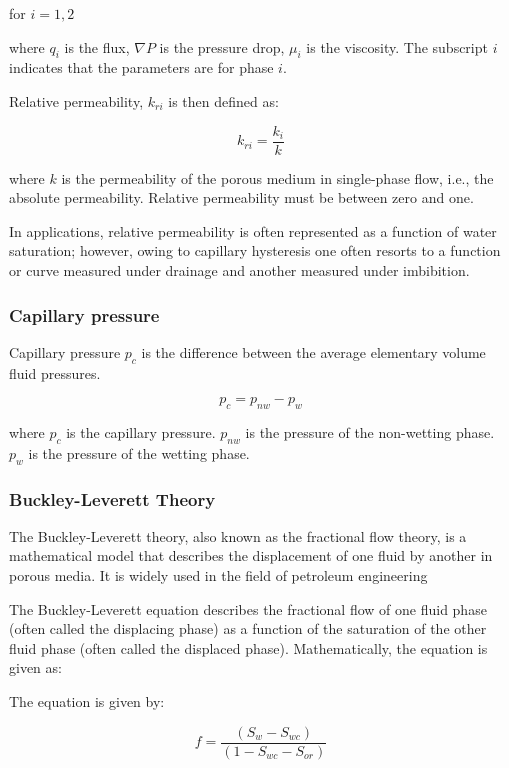 		for $i = 1 , 2$
		
		where $q_{i}$ is the flux, $\nabla P$ is the pressure drop, $\mu _{i}$ is the viscosity. The subscript $i$ indicates that the parameters are for phase $i$.

		Relative permeability, $k_{ri}$ is then defined as:

		\[ k_{ri} = \frac{k_{i}}{k} \]

		where $k$ is the permeability of the porous medium in single-phase flow, i.e., the absolute permeability. Relative permeability must be between zero and one.

		In applications, relative permeability is often represented as a function of water saturation; however, owing to capillary hysteresis one often resorts to a function or curve measured under drainage and another measured under imbibition. \cite{bravo2008analysis}
	
	
	\subsubsection{Capillary pressure}
		Capillary pressure $p_{c}$  is the difference between the average elementary volume fluid pressures.
		
		\begin{equation}
			p_{c} = p_{nw} - p_{w}
		\end{equation}
		
		where $p_{c}$ is the capillary pressure. $p_{nw}$ is the pressure of the non-wetting phase. $p_{w}$ is the pressure of the wetting phase.
	
	\subsubsection{Buckley-Leverett Theory}
		The Buckley-Leverett theory, also known as the fractional flow theory, is a mathematical model that describes the displacement of one fluid by another in porous media. It is widely used in the field of petroleum engineering 

		The Buckley-Leverett equation describes the fractional flow of one fluid phase (often called the displacing phase) as a function of the saturation of the other fluid phase (often called the displaced phase). Mathematically, the equation is given as:

		The equation is given by:

		\begin{equation}
			f = \frac{{(S_w - S_{wc})}}{{(1 - S_{wc} - S_{or})}}
		\end{equation}

